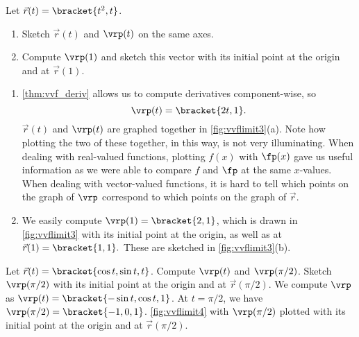 \begin{example}\label{ex_vvflimit3}
Let $\vec r(t) =\bracket{t^2,t}$. 
\begin{enumerate}
	\item Sketch $\vec r(t)$ and $\vrp(t)$ on the same axes.
	\item	Compute $\vrp(1)$ and sketch this vector with its initial point at the origin and at $\vec r(1)$.
\end{enumerate}
\solution
\begin{enumerate}
\item	\autoref{thm:vvf_deriv} allows us to compute derivatives component-wise, so
\[\vrp(t) =\bracket{2t, 1}.\]
$\vec r(t)$ and $\vrp(t)$ are graphed together in \autoref{fig:vvflimit3}(a). Note how plotting the two of these together, in this way, is not very illuminating. When dealing with real-valued functions, plotting $f(x)$ with $\fp(x)$ gave us useful information as we were able to compare $f$ and $\fp$ at the same $x$-values. When dealing with vector-valued functions, it is hard to tell which points on the graph of $\vrp$ correspond to which points on the graph of $\vec r$.

\item	We easily compute $\vrp(1) =\bracket{2,1}$, which is drawn in \autoref{fig:vvflimit3} with its initial point at the origin, as well as at $\vec r(1) =\bracket{1,1}.$ These are sketched in \autoref{fig:vvflimit3}(b).
\end{enumerate}
\end{example}

\iftoggle{in_threeD}{%
\mtable{Viewing a vector-valued function and its derivative at one point.}{fig:vvflimit4}{%
\myincludeasythree{width=.7\marginparwidth,
3Droll=-0.5856992334166129,
3Dortho=0.004399999976158142,
3Dc2c=0.6354137063026428 0.6317671537399292 0.4439816176891327,
3Dcoo=-18.837804794311523 -8.740551948547363 60.22870635986328,
3Droo=150.0000027221829}{width=.7\marginparwidth}{figures/figvvflimit4_3D}}%
}{%
\mtable[-3\baselineskip]{Viewing a vector-valued function and its derivative at one point, from two different perspectives.}{fig:vvflimit4}{%
\myincludegraphics[width=.7\marginparwidth]{figures/figvvflimit4_3D}
\\(a)\\
\myincludegraphics[width=.7\marginparwidth]{figures/figvvflimit4a_3D}
\\(b)}%
}%

\begin{example}\label{ex_vvflimit4}
Let $\vec r(t) =\bracket{\cos t, \sin t, t}$. Compute $\vrp(t)$ and $\vrp(\pi/2)$. Sketch $\vrp(\pi/2)$ with its initial point at the origin and at $\vec r(\pi/2)$.
\solution
We compute $\vrp$ as $\vrp(t) =\bracket{-\sin t, \cos t, 1}$. At $t= \pi/2$, we have $\vrp(\pi/2) =\bracket{-1,0,1}$. \autoref{fig:vvflimit4}
\iftoggle{in_threeD}{shows a graph of $\vec r(t)$,}{shows two graphs of $\vec r(t)$, from different perspectives,}
with $\vrp(\pi/2)$ plotted with its initial point at the origin and at $\vec r(\pi/2)$.
\end{example}

